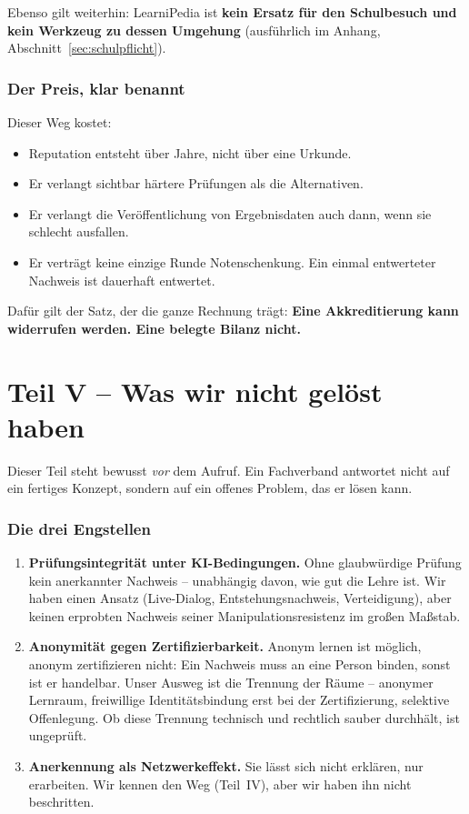 \documentclass[11pt,a4paper]{article}
\newcommand{\teilnummerierung}[1]{%
    \setcounter{section}{0}%
    \renewcommand{\thesection}{#1.\arabic{section}}%
    \renewcommand{\theHsection}{#1.\arabic{section}}%
}
\begin{document}
Ebenso gilt weiterhin: LearniPedia ist \textbf{kein Ersatz für den Schulbesuch und kein Werkzeug zu dessen Umgehung} (ausführlich im Anhang, Abschnitt~\ref{sec:schulpflicht}).

\section{Der Preis, klar benannt}
Dieser Weg kostet:
\begin{itemize}[label=--]
    \item Reputation entsteht über Jahre, nicht über eine Urkunde.
    \item Er verlangt sichtbar härtere Prüfungen als die Alternativen.
    \item Er verlangt die Veröffentlichung von Ergebnisdaten auch dann, wenn sie schlecht ausfallen.
    \item Er verträgt keine einzige Runde Notenschenkung. Ein einmal entwerteter Nachweis ist dauerhaft entwertet.
\end{itemize}
\noindent Dafür gilt der Satz, der die ganze Rechnung trägt: \textbf{Eine Akkreditierung kann widerrufen werden. Eine belegte Bilanz nicht.}

\part*{Teil V -- Was wir nicht gelöst haben}
\teilnummerierung{V}

\noindent Dieser Teil steht bewusst \textit{vor} dem Aufruf. Ein Fachverband antwortet nicht auf ein fertiges Konzept, sondern auf ein offenes Problem, das er lösen kann.

\section{Die drei Engstellen}
\begin{enumerate}[label=\textbf{\arabic*.}, leftmargin=2em]
    \item \textbf{Prüfungsintegrität unter KI-Bedingungen.} Ohne glaubwürdige Prüfung kein anerkannter Nachweis -- unabhängig davon, wie gut die Lehre ist. Wir haben einen Ansatz (Live-Dialog, Entstehungsnachweis, Verteidigung), aber keinen erprobten Nachweis seiner Manipulationsresistenz im großen Maßstab.
    \item \textbf{Anonymität gegen Zertifizierbarkeit.} Anonym lernen ist möglich, anonym zertifizieren nicht: Ein Nachweis muss an eine Person binden, sonst ist er handelbar. Unser Ausweg ist die Trennung der Räume -- anonymer Lernraum, freiwillige Identitätsbindung erst bei der Zertifizierung, selektive Offenlegung. Ob diese Trennung technisch und rechtlich sauber durchhält, ist ungeprüft.
    \item \textbf{Anerkennung als Netzwerkeffekt.} Sie lässt sich nicht erklären, nur erarbeiten. Wir kennen den Weg (Teil~IV), aber wir haben ihn nicht beschritten.
\end{enumerate}
\end{document}
